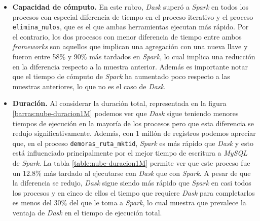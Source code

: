 \begin{itemize}
	\item \textbf{Capacidad de cómputo.} En este rubro, \textit{Dask} superó a \textit{Spark} en todos los procesos con especial diferencia de tiempo en el proceso iterativo y el proceso \texttt{elimina\_nulos}, que es el que ambas herramientas ejecutan más rápido. Por el contrario, los dos procesos con menor diferencia de tiempo entre ambos \textit{frameworks} son aquellos que implican una agregación con una nueva llave y fueron entre 58\% y 90\% más tardados en \textit{Spark}, lo cual implica una reducción en la diferencia respecto a la muestra anterior. Además es importante notar que el tiempo de cómputo de \textit{Spark} ha aumentado poco respecto a las muestras anteriores, lo que no es el caso de \textit{Dask}.
	
	\item \textbf{Duración.} Al considerar la duración total, representada en la figura \ref{barras:nube-duracion1M} podemos ver que \textit{Dask} sigue teniendo menores tiempos de ejecución en la mayoría de los procesos pero que esta diferencia se redujo significativamente. Además, con 1 millón de registros podemos apreciar que, en el proceso \texttt{demoras\_ruta\_mktid}, \textit{Spark} es más rápido que \textit{Dask} y esto está influenciado principalmente por el mejor tiempo de escritura a \textit{MySQL} de \textit{Spark}. La tabla \ref{table:nube-duracion1M} permite ver que este proceso fue un 12.8\% más tardado al ejecutarse con \textit{Dask} que con \textit{Spark}. A pesar de que la diferencia se redujo, \textit{Dask} sigue siendo más rápido que \textit{Spark} en casi todos los procesos y en cinco de ellos el tiempo que requiere \textit{Dask} para completarlos es menos del 30\% del que le toma a \textit{Spark}, lo cual muestra que prevalece la ventaja de \textit{Dask} en el tiempo de ejecución total.
\end{itemize}

